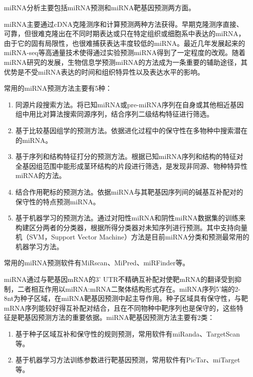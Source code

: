 \documentclass[11pt,a4paper,twoside]{book}
\begin{document}
miRNA分析主要包括miRNA预测和miRNA靶基因预测两方面。

miRNA主要通过cDNA克隆测序和计算预测两种方法获得。早期克隆测序直接、可靠，但很难克隆出在不同时期表达或只在特定组织或细胞系中表达的miRNA，由于它的固有局限性，也很难捕获表达丰度较低的miRNA。最近几年发展起来的miRNA-seq等高通量技术使得通过实验预测miRNA得到了一定程度的改观。随着miRNA研究的发展，生物信息学预测miRNA的方法成为一条重要的辅助途径，其优势是不受miRNA表达的时间和组织特异性以及表达水平的影响。

常用的miRNA预测方法主要有5种：
\begin{enumerate}
  \item 同源片段搜索方法。将已知miRNA或pre-miRNA序列在自身或其他相近基因组中用比对算法搜索同源序列，结合序列二级结构特征进行筛选。
  \item 基于比较基因组学的预测方法。依据进化过程中的保守性在多物种中搜索潜在的miRNA。
  \item 基于序列和结构特征打分的预测方法。根据已知miRNA序列和结构的特征对全基因组范围中能形成茎环结构的片段进行筛选，是发现非同源、物种特异性miRNA的方法。
  \item 结合作用靶标的预测方法。依据miRNA与其靶基因序列间的碱基互补配对的保守性的特点预测miRNA。
  \item 基于机器学习的预测方法。通过对阳性miRNA和阴性miRNA数据集的训练来构建区分两者的分类器，根据所得分类器对未知序列进行预测。其中支持向量机（SVM，Support Vector Machine）方法是目前miRNA分类和预测最常用的机器学习方法。
\end{enumerate}
常用的miRNA预测软件有MiRscan、MiPred、miRFinder等。

miRNA通过与靶基因mRNA的3' UTR不精确互补配对使靶mRNA的翻译受到抑制，二者相互作用以miRNA:mRNA二聚体结构形式存在。miRNA序列5'端的2-8nt为种子区域，在miRNA靶基因预测中起主导作用。种子区域具有保守性，与靶mRNA序列能较好得互补配对结合，且在不同物种中靶序列也是保守的，这些特征是靶基因预测方法的重要依据。miRNA靶基因预测方法主要有2类：
\begin{enumerate}
  \item 基于种子区域互补和保守性的规则预测，常用软件有miRanda、TargetScan等。
  \item 基于机器学习方法训练参数进行靶基因预测，常用软件有PicTar、miTarget等。
\end{enumerate}
\end{document}
